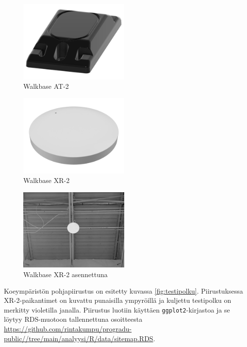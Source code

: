 \documentclass[
  12pt,
  a4paper, twoside]{book}
\begin{document}
\begin{multicols}{2}
\begin{figure}[H]
\centering
\includegraphics[width=5.5cm]{at_2}
\caption{Walkbase AT-2}
\label{fig:at2}
\end{figure}

\begin{figure}[H]
\centering
\includegraphics[width=5.5cm]{xr_2_plain}
\caption{Walkbase XR-2}
\label{fig:xr2}
\end{figure}
\end{multicols}

\begin{figure}[H]
\centering
\includegraphics[width=5.5cm]{xr_2_installed}
\caption{Walkbase XR-2 asennettuna}
\label{fig:xr2_installed}
\end{figure}

Koeympäristön pohjapiirustus on esitetty kuvassa \ref{fig:testipolku}. Piirustuksessa XR-2-paikantimet on kuvattu punaisilla ympyröillä ja kuljettu testipolku on merkitty violetilla janalla. Piirustus luotiin käyttäen \texttt{ggplot2}-kirjastoa ja se löytyy RDS-muotoon tallennettuna osoitteesta \newline \url{https://github.com/rintakumpu/progradu-public//tree/main/analyysi/R/data/sitemap.RDS}.
\end{document}
